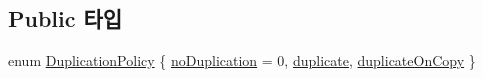 \subsection*{Public 타입}
\begin{DoxyCompactItemize}
\item 
enum \hyperlink{class_json_1_1_value_1_1_c_z_string_a2805c46fb4a72bbaed55de6d75941b6d}{Duplication\+Policy} \{ \hyperlink{class_json_1_1_value_1_1_c_z_string_a2805c46fb4a72bbaed55de6d75941b6da08d540450fa6c4af57eaacf063eedd20}{no\+Duplication} = 0, 
\hyperlink{class_json_1_1_value_1_1_c_z_string_a2805c46fb4a72bbaed55de6d75941b6dabb2134294dd8fc37dd82d18bb794fe20}{duplicate}, 
\hyperlink{class_json_1_1_value_1_1_c_z_string_a2805c46fb4a72bbaed55de6d75941b6da5c18c35205a3be63ad14ce659e70fe7d}{duplicate\+On\+Copy}
 \}
\end{DoxyCompactItemize}
